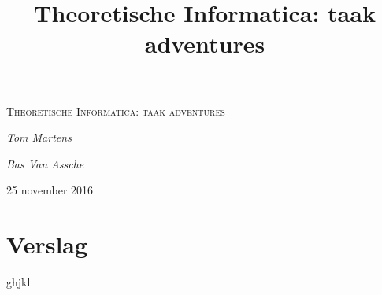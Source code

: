 \documentclass[a4paper, 11pt]{article}
\title{Theoretische Informatica: taak adventures}
\begin{document}
	\begin{titlepage}
		\centering
		\vspace{3cm}
		{\scshape \LARGE Theoretische Informatica: taak adventures \par}
		\vspace{6cm}
		{\Large \itshape Tom Martens\par}
		{\Large \itshape Bas Van Assche\par}
		\vspace{2cm}
		\vspace{5cm}
		\vfill
		{\large 25 november 2016}
		
	\end{titlepage}
	
	\pagebreak
	\tableofcontents
	\pagebreak

	\section{Verslag}
		ghjkl
\end{document}
